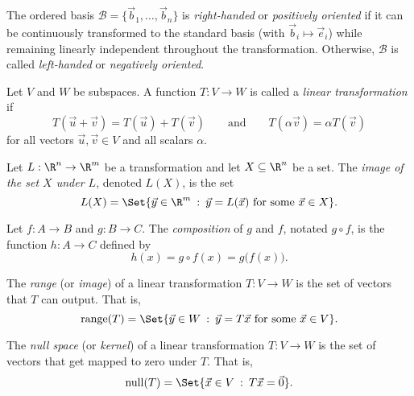 \begin{SaveDefinition}[key=OrientationofaBasis, title={Orientation of a Basis}]
	The ordered basis $\mathcal B=\{\vec b_{1},\ldots,\vec b_{n}\}$ is
	\emph{right-handed} or
	\emph{positively oriented} if it can be continuously transformed to the
	standard basis (with $\vec b_{i}\mapsto \vec e_{i}$) while remaining
	linearly independent throughout the transformation. Otherwise,
	$\mathcal B$ is called
	\emph{left-handed} or
	\emph{negatively oriented}.
\end{SaveDefinition}

\begin{SaveDefinition}[key=LinearTransformation, title={Linear Transformation}]
	Let $V$ and $W$ be subspaces. A function $T:V\to W$ is called a
	\emph{linear transformation} if
	\[
		T(\vec u+\vec v)=T(\vec u)+T(\vec v) \qquad\text{and}\qquad T(\alpha
		\vec v)=\alpha T(\vec v)
	\]
	 for all vectors $\vec u,\vec v\in V$ and all scalars $\alpha$.
\end{SaveDefinition}

\begin{SaveDefinition}[key=ImageofaSet, title={Image of a Set}]
	Let $L:\R^n\to \R^m$ be a transformation and let $X\subseteq \R^n$ be a set. The
	\emph{image of the set $X$ under $L$}, denoted $L(X)$, is the set
	\[
		L(X)=\Set{\vec y\in \R^m \given \vec y=L(\vec x)\text{ for some }\vec
		x\in X}.
	\]
\end{SaveDefinition}

\begin{SaveDefinition}[key=CompositionofFunctions, title={Composition of Functions}]
	Let $f:A\to B$ and $g:B\to C$. The \emph{composition} of $g$ and $f$, notated $g\circ f$,
	is the function $h:A\to C$ defined by
	\[
		h(x)=g\circ f(x) = g\Big(f(x)\Big).
	\]
\end{SaveDefinition}

\begin{SaveDefinition}[key=Range, title={Range}]
	The
	\emph{range} (or
	\emph{image}) of a linear transformation $T:V\to W$ is the set of vectors
	that $T$ can output. That is,
	\[
		\Range(T)=\Set{\vec y\in W \given \vec y=T\vec x\text{ for some }\vec
		x\in V}.
	\]

\end{SaveDefinition}

\begin{SaveDefinition}[key=NullSpace, title={Null Space}]
	The
	\emph{null space} (or
	\emph{kernel}) of a linear transformation $T:V\to W$ is the set of vectors
	that get mapped to zero under $T$. That is,
	\[
		\Null(T)=\Set{\vec x\in V \given T\vec x=\vec 0}.
	\]

\end{SaveDefinition}

